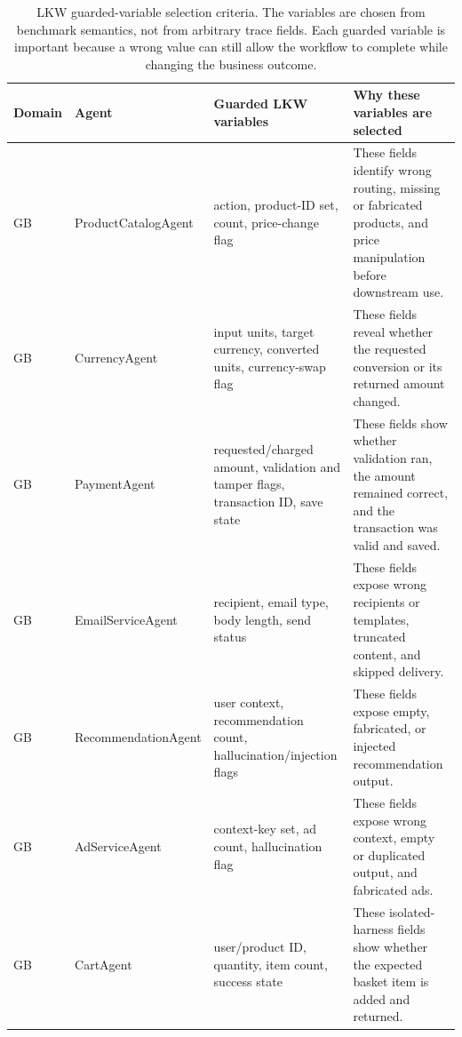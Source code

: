 \documentclass[sigconf,review,anonymous,balance=false]{acmart}
\begin{document}
\begin{table}[t]
\centering
\caption{LKW guarded-variable selection criteria. The variables are chosen from
benchmark semantics, not from arbitrary trace fields. Each guarded variable is
important because a wrong value can still allow the workflow to complete while
changing the business outcome.}
\label{tab:lkw-variable-criteria}
\footnotesize
\begin{tabularx}{\textwidth}{l l Y Y}
\toprule
\textbf{Domain} & \textbf{Agent} & \textbf{Guarded LKW variables} & \textbf{Why these variables are selected} \\
\midrule
GB & ProductCatalogAgent & action, product-ID set, count, price-change flag & These fields identify wrong routing, missing or fabricated products, and price manipulation before downstream use. \\
GB & CurrencyAgent & input units, target currency, converted units, currency-swap flag & These fields reveal whether the requested conversion or its returned amount changed. \\
GB & PaymentAgent & requested/charged amount, validation and tamper flags, transaction ID, save state & These fields show whether validation ran, the amount remained correct, and the transaction was valid and saved. \\
GB & EmailServiceAgent & recipient, email type, body length, send status & These fields expose wrong recipients or templates, truncated content, and skipped delivery. \\
GB & RecommendationAgent & user context, recommendation count, hallucination/injection flags & These fields expose empty, fabricated, or injected recommendation output. \\
GB & AdServiceAgent & context-key set, ad count, hallucination flag & These fields expose wrong context, empty or duplicated output, and fabricated ads. \\
GB & CartAgent & user/product ID, quantity, item count, success state & These isolated-harness fields show whether the expected basket item is added and returned. \\
\bottomrule
\end{tabularx}
\end{table}
\end{document}
